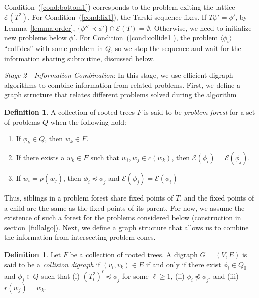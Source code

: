 \documentclass[11pt,reqno]{amsart}
\theoremstyle{definition}
\newtheorem{defn}[thm]{Definition}
\numberwithin{equation}{section}
\newcommand{\lag}{\langle}
\newcommand{\rag}{\rangle}
\newcommand{\pre}{\phi}
\newcommand{\fix}{\mathcal{E}}
\newcommand{\peq}{\preceq}
\newcommand{\pe}{\prec}
\newcommand{\acto}{Q_0}
\newcommand{\act}{Q}
\newcommand{\forest}{F}
\begin{document}
Condition~(\ref{cond:bottom1}) corresponds to the problem exiting the lattice $\fix(T^2)$. 
For Condition~(\ref{cond:fix1}), the Tarski sequence fixes.
If $T\pre' = \pre'$, by Lemma~\ref{lemma:order}, $\{\pre'' \pe \pre'\} \cap \fix(T) = \emptyset$. 
Otherwise, we need to initialize new problems below $\pre'$.
For Condition~(\ref{cond:collide1}), the problem $\lag \pre_i \rag$ ``collides'' with some problem in $\act$, so we stop the sequence and wait for the information sharing subroutine, discussed below.

\emph{Stage 2 - Information Combination}: In this stage, we use efficient digraph algorithms to combine information from related problems.
First, we define a graph structure that relates different problems solved during the algorithm
\begin{defn} \label{def:forest}
A collection of rooted trees $\forest$ is said to be \emph{problem forest} for a set of problems $\act$ when the following hold:

\begin{enumerate}
\item If $\pre_k \in Q$, then $w_k \in \forest$. \label{def:forest1}
\item If there exists a $w_k \in F$ such that $w_i, w_j \in c(w_k)$, then $\fix(\pre_i) = \fix(\pre_j)$. \label{def:forest2}
\item If $w_i = p(w_j)$, then $\pre_i \peq \pre_j$ and $\fix(\pre_j) = \fix(\pre_i)$ \label{def:forest3} 
\end{enumerate} 

\end{defn}

Thus, siblings in a problem forest share fixed points of $T$, and the fixed points of a child are the same as the fixed points of its parent. 
For now, we assume the existence of such a forest for the problems considered below (construction in section~\ref{fullalgo}). Next, we define a graph structure that allows us to combine the information from intersecting problem cones.

\begin{defn} \label{def:graph}
Let $\forest$ be a collection of rooted trees. A digraph $G = (V,E)$ is said to be a \emph{collision digraph} if $(v_i,v_k) \in E$ if and only if there exist $\pre_i \in \acto$ and $\pre_j \in \act$ such that (i) $(T_i^2)^{\ell} \peq \pre_j$ for some $\ell \geq 1$, (ii) $\pre_i \not \peq \pre_j$, and (iii) $r(w_j) = w_k$.
\end{defn}
\end{document}
